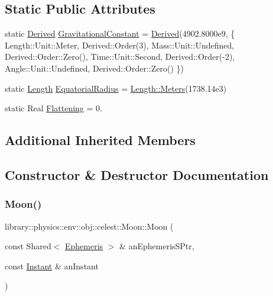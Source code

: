 \subsection*{Static Public Attributes}
\begin{DoxyCompactItemize}
\item 
static \hyperlink{classlibrary_1_1physics_1_1units_1_1_derived}{Derived} \hyperlink{classlibrary_1_1physics_1_1env_1_1obj_1_1celest_1_1_moon_aee16207c53ac86140c994da72cce64d2}{Gravitational\+Constant} = \hyperlink{classlibrary_1_1physics_1_1units_1_1_derived}{Derived}(4902.\+8000e9, \{ Length\+::\+Unit\+::\+Meter, Derived\+::\+Order(3), Mass\+::\+Unit\+::\+Undefined, Derived\+::\+Order\+::\+Zero(), Time\+::\+Unit\+::\+Second, Derived\+::\+Order(-\/2), Angle\+::\+Unit\+::\+Undefined, Derived\+::\+Order\+::\+Zero() \})
\item 
static \hyperlink{classlibrary_1_1physics_1_1units_1_1_length}{Length} \hyperlink{classlibrary_1_1physics_1_1env_1_1obj_1_1celest_1_1_moon_a6b22597902ccee09be70ae4eecca2174}{Equatorial\+Radius} = \hyperlink{classlibrary_1_1physics_1_1units_1_1_length_ad523a3737d5c3f23a64588eac83f2148}{Length\+::\+Meters}(1738.\+14e3)
\item 
static Real \hyperlink{classlibrary_1_1physics_1_1env_1_1obj_1_1celest_1_1_moon_a02e660fcf1bf06697a037a354f698499}{Flattening} = 0.
\end{DoxyCompactItemize}
\subsection*{Additional Inherited Members}


\subsection{Constructor \& Destructor Documentation}
\mbox{\label{classlibrary_1_1physics_1_1env_1_1obj_1_1celest_1_1_moon_aa7c19c2d391128ca7f4af52915b11261}} 
\subsubsection{\texorpdfstring{Moon()}{Moon()}}
{\footnotesize\ttfamily library\+::physics\+::env\+::obj\+::celest\+::\+Moon\+::\+Moon (\begin{DoxyParamCaption}\item[{const Shared$<$ \hyperlink{classlibrary_1_1physics_1_1env_1_1_ephemeris}{Ephemeris} $>$ \&}]{an\+Ephemeris\+S\+Ptr,  }\item[{const \hyperlink{classlibrary_1_1physics_1_1time_1_1_instant}{Instant} \&}]{an\+Instant }\end{DoxyParamCaption})}

